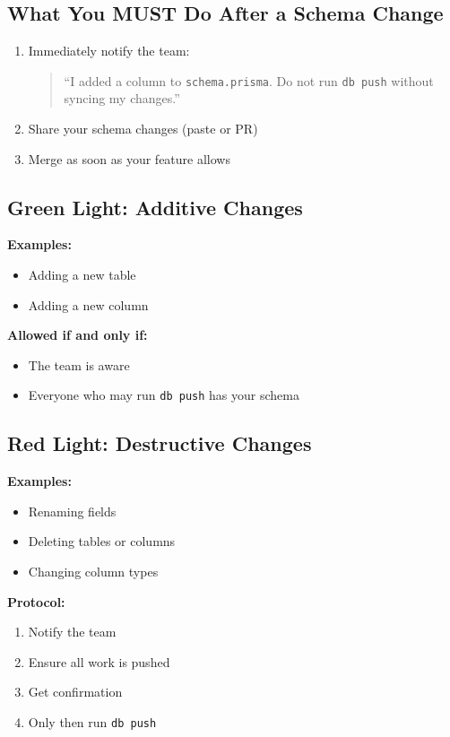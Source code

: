 \documentclass[11pt]{article}
\begin{document}
\subsection*{What You MUST Do After a Schema Change}

\begin{enumerate}
    \item Immediately notify the team:
\begin{quote}
``I added a column to \texttt{schema.prisma}. Do not run \texttt{db push} without syncing my changes.''
\end{quote}

    \item Share your schema changes (paste or PR)
    \item Merge as soon as your feature allows
\end{enumerate}

\subsection*{Green Light: Additive Changes}

\textbf{Examples:}
\begin{itemize}
    \item Adding a new table
    \item Adding a new column
\end{itemize}

\textbf{Allowed if and only if:}
\begin{itemize}
    \item The team is aware
    \item Everyone who may run \texttt{db push} has your schema
\end{itemize}

\subsection*{Red Light: Destructive Changes}

\textbf{Examples:}
\begin{itemize}
    \item Renaming fields
    \item Deleting tables or columns
    \item Changing column types
\end{itemize}

\textbf{Protocol:}
\begin{enumerate}
    \item Notify the team
    \item Ensure all work is pushed
    \item Get confirmation
    \item Only then run \texttt{db push}
\end{enumerate}
\end{document}
